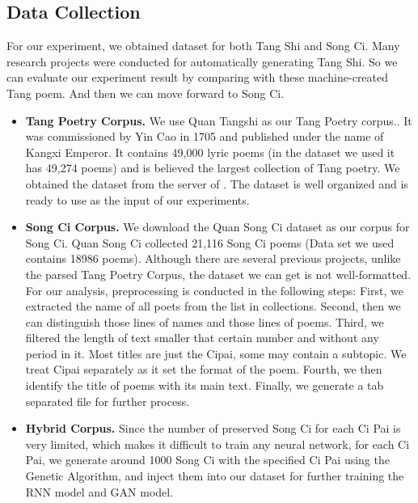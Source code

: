 \subsection{Data Collection}   
For our experiment, we obtained dataset for both Tang Shi and Song Ci. Many research projects were conducted for automatically generating Tang Shi. So we can evaluate our experiment result by comparing with these machine-created Tang poem. And then we can move forward to Song Ci.

\begin{itemize}
\item \textbf{Tang Poetry Corpus.} We use Quan Tangshi as our Tang Poetry corpus.\cite{1960quantangshi}. It was commissioned by Yin Cao in 1705 and published under the name of Kangxi Emperor. It contains 49,000 lyric poems (in the dataset we used it has 49,274 poems) and is believed the largest collection of Tang poetry. We obtained the dataset from the server of \cite{zhang2014chinese}. The dataset is well organized and is ready to use as the input of our experiments.

\item \textbf{Song Ci Corpus.} We download the Quan Song Ci dataset as our corpus for Song Ci. Quan Song Ci collected 21,116 Song Ci poems (Data set we used contains 18986 poems). Although there are several previous projects, unlike the parsed Tang Poetry Corpus, the dataset we can get is not well-formatted. For our analysis, preprocessing is conducted in the following steps: First, we extracted the name of all poets from the list in collections. Second, then we can distinguish those lines of names and those lines of poems. Third, we filtered the length of text smaller that certain number and without any period in it. Most titles are just the Cipai, some may contain a subtopic. We treat Cipai separately as it set the format of the poem. Fourth, we then identify the title of poems with its main text. Finally, we generate a tab separated file for further process.

\item \textbf {Hybrid Corpus.} Since the number of preserved Song Ci for each Ci Pai is very limited, which makes it difficult to train any neural network, for each Ci Pai, we generate around 1000 Song Ci with the specified Ci Pai using the Genetic Algorithm, and inject them into our dataset for further training the RNN model and GAN model.
\end{itemize}

